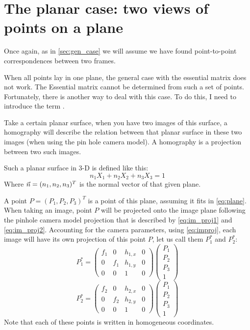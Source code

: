 \section{The planar case: two views of points on a plane}
Once again, as in \autoref{sec:gen_case} we will assume we have found point-to-point correspondences between two frames.\bigskip

When all points lay in one plane, the general case with the essential matrix does not work. The Essential matrix cannot be determined from such a set of points. Fortunately, there is another way to deal with this case. To do this, I need to introduce the term . \bigskip

Take a certain planar surface, when you have two images of this surface, a homography will describe the relation between that planar surface in these two images (when using the pin hole camera model). A homography is a projection between two such images.\bigskip

Such a planar surface in 3-D is defined like this:
\begin{equation}\label{eq:plane}
    n_1X_1 + n_2X_2 + n_3X_3 = 1
\end{equation}
Where $\vec n = (n_1, n_2, n_3)^T$ is the normal vector of that given plane.\bigskip

A point $P = (P_1, P_2, P_3)^T$ is a point of this plane, assuming it fits in \autoref{eq:plane}. When taking an image, point $P$ will be projected onto the image plane following the pinhole camera model projection that is described by \autoref{eq:im_proj1} and \autoref{eq:im_proj2}. Accounting for the camera parameters, using \autoref{eq:improj}, each image will have its own projection of this point $P$, let us call them $P^*_1$ and $P^*_2$:
\begin{equation}
    P^*_1 = \begin{pmatrix}
        f_1 & 0 & h_{1,x} & 0\\ 
        0 & f_1 & h_{1,y} & 0\\ 
        0 & 0 & 1 & 0
    \end{pmatrix}
    \begin{pmatrix}
        P_1 \\ P_2 \\ P_3 \\ 1
    \end{pmatrix}
\end{equation}
\begin{equation}
    P^*_2 = \begin{pmatrix}
        f_2 & 0 & h_{2,x} & 0\\ 
        0 & f_2 & h_{2,y} & 0\\ 
        0 & 0 & 1 & 0
    \end{pmatrix}
    \begin{pmatrix}
        P_1 \\ P_2 \\ P_3 \\ 1
    \end{pmatrix}
\end{equation}
Note that each of these points is written in homogeneous coordinates.

